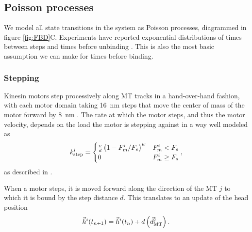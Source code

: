 \subsection{Poisson processes}


We model all state transitions in the system as Poisson processes, diagrammed in figure \ref{fig:FBD}C. Experiments have reported exponential distributions of times between steps \cite{Carter2005} and times before unbinding \cite{Kunwar2011}. This is also the most basic assumption we can make for times before binding.


\subsubsection*{Stepping}

Kinesin motors step processively along MT tracks in a hand-over-hand fashion, with each motor domain taking \SI{16}{\nano\meter} steps \cite{Yildiz2004} that move the center of mass of the motor forward by \SI{8}{\nano\meter} \cite{Svoboda1993}. The rate at which the motor steps, and thus the motor velocity, depends on the load the motor is stepping against in a way well modeled as 
\begin{equation} \label{eq:stepping}
k_\text{step}^i = 
\begin{cases}
\frac{v}{d}\left(1-F_m^i/F_s \right)^w & F_m^i < F_s \\
0 & F_m^i \geq F_s
\end{cases},
\end{equation}
as described in \cite{Kunwar2010}.

When a motor steps, it is moved forward along the direction of the MT $j$ to which it is bound by the step distance $d$. This translates to an update of the head position 
\begin{equation} \label{eq:step_head}
\vec{h}^i(t_{n+1}) = \vec{h}^i(t_n) + d \left(\vec{d}_\text{MT}^j \right).
\end{equation}

